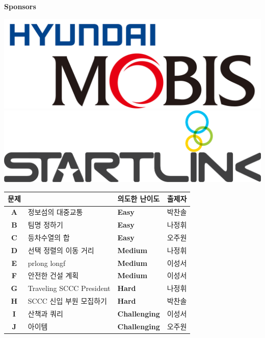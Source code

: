     \begin{frame}{\textbf{Sponsors}}
        \begin{center}
            \includegraphics[width=0.36\linewidth]{images/logos/mobis.jpg}\\
            \vspace{10mm}
            \includegraphics[width=0.36\linewidth]{images/logos/startlink.png}
        \end{center}
    \end{frame}
    
    \begin{frame} %
        \begin{center}
            \begin{tabular}{cl|l|l}
                \hline
                문제 & & 의도한 난이도 & 출제자 \\
                \hline
                \hline
                \textbf{A} & 정보섬의 대중교통 & \textbf{\color{acbronze} Easy} & 박찬솔 \\
                \textbf{B} & 팀명 정하기 & \textbf{\color{acbronze} Easy} & 나정휘 \\
                \textbf{C} & 등차수열의 합 & \textbf{\color{acbronze} Easy} & 오주원 \\
                \textbf{D} & 선택 정렬의 이동 거리 & \textbf{\color{acsilver} Medium} & 나정휘 \\
                \textbf{E} & prlong longf & \textbf{\color{acsilver} Medium} & 이성서 \\
                \textbf{F} & 안전한 건설 계획 & \textbf{\color{acsilver} Medium} & 이성서 \\
                \textbf{G} & Traveling SCCC President & \textbf{\color{acgold} Hard} & 나정휘 \\
                \textbf{H} & SCCC 신입 부원 모집하기 & \textbf{\color{acgold} Hard} & 박찬솔 \\
                \textbf{I} & 산책과 쿼리 & \textbf{\color{acplatinum} Challenging} & 이성서 \\
                \textbf{J} & 아이템 & \textbf{\color{acplatinum} Challenging} & 오주원 \\
                \hline
            \end{tabular}
        \end{center}
    \end{frame}
    

